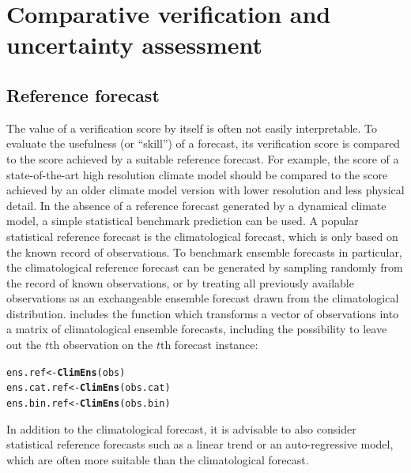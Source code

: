 \documentclass[article]{jss}\usepackage{graphicx, color}
\makeatletter
\newcommand{\hlfunctioncall}[1]{\textcolor[rgb]{0,0.501960784313725,0.752941176470588}{\textbf{#1}}}%
\newenvironment{kframe}{%
 \def\at@end@of@kframe{}%
 \ifinner\ifhmode%
  \def\at@end@of@kframe{\end{minipage}}%
  \begin{minipage}{\columnwidth}%
 \fi\fi%
 \def\FrameCommand##1{\hskip\@totalleftmargin \hskip-\fboxsep
 \colorbox{shadecolor}{##1}\hskip-\fboxsep
     \hskip-\linewidth \hskip-\@totalleftmargin \hskip\columnwidth}%
 \MakeFramed {\advance\hsize-\width
   \@totalleftmargin\z@ \linewidth\hsize
   \@setminipage}}%
 {\par\unskip\endMakeFramed%
 \at@end@of@kframe}
\newenvironment{knitrout}{}{} %
\makeatother
\begin{document}
\section{Comparative verification and uncertainty assessment}


\subsection{Reference forecast}

The value of a verification score by itself is often not easily interpretable.
To evaluate the usefulness (or ``skill'') of a forecast, its verification score is compared to the score achieved by a suitable reference forecast.
For example, the score of a state-of-the-art high resolution climate model should be compared to the score achieved by an older climate model version with lower resolution and less physical detail.
In the absence of a reference forecast generated by a dynamical climate model, a simple statistical benchmark prediction can be used.
A popular statistical reference forecast is the climatological forecast, which is only based on the known record of observations.
To benchmark ensemble forecasts in particular, the climatological reference forecast can be generated by sampling randomly from the record of known observations, or by treating all previously available observations as an exchangeable ensemble forecast drawn from the climatological distribution.
 includes the function  which transforms a vector of observations into a matrix of climatological ensemble forecasts, including the possibility to leave out the $t$th observation on the $t$th forecast instance:
%
\begin{knitrout}
\color{fgcolor}\begin{kframe}
\begin{alltt}
ens.ref     <- \hlfunctioncall{ClimEns}(obs)
ens.cat.ref <- \hlfunctioncall{ClimEns}(obs.cat)
ens.bin.ref <- \hlfunctioncall{ClimEns}(obs.bin)
\end{alltt}
\end{kframe}
\end{knitrout}

%
In addition to the climatological forecast, it is advisable to also consider statistical reference forecasts such as a linear trend or an auto-regressive model, which are often more suitable than the climatological forecast.
\end{document}
